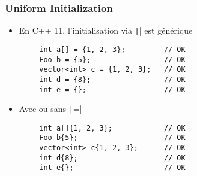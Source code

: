 \documentclass[C++.tex]{subfiles}
\begin{document}
\begin{frame}[fragile]
	\frametitle{Uniform Initialization}
	\begin{itemize}
		\item En C++ 11, l'initialisation via \texttt|{}| est générique
	\end{itemize}

	\begin{verbatim}
		int a[] = {1, 2, 3};         // OK
		Foo b = {5};                 // OK
		vector<int> c = {1, 2, 3};   // OK
		int d = {8};                 // OK
		int e = {};                  // OK
	\end{verbatim}

	\begin{itemize}
		\item Avec ou sans \texttt|=|
	\end{itemize}

	\begin{verbatim}
		int a[]{1, 2, 3};            // OK
		Foo b{5};                    // OK
		vector<int> c{1, 2, 3};      // OK
		int d{8};                    // OK
		int e{};                     // OK
	\end{verbatim}

\end{frame}
\end{document}
